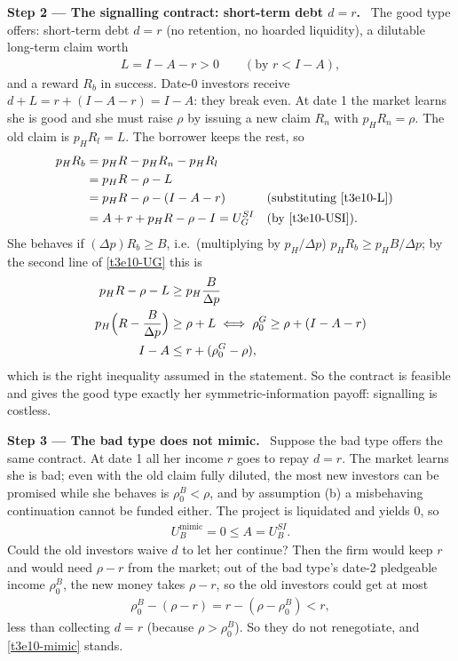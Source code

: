\documentclass[11pt,a4paper]{article}
\newcommand{\step}[2]{\par\medskip\noindent\textbf{Step #1 --- #2.}~}
\begin{document}
\step{2}{The signalling contract: short-term debt $d=r$} The good type offers: short-term debt $d=r$ (no
retention, no hoarded liquidity), a dilutable long-term claim worth
\begin{align}
  L = I-A-r > 0 \qquad (\text{by } r<I-A), \label{t3e10-L}
\end{align}
and a reward $R_b$ in success. Date-0 investors receive $d+L=r+(I-A-r)=I-A$: they break even. At date 1
the market learns she is good and she must raise $\rho$ by issuing a new claim $R_n$ with
$p_HR_n=\rho$. The old claim is $p_HR_l=L$. The borrower keeps the rest, so
\begin{align}
  p_HR_b &= p_HR-p_HR_n-p_HR_l \nonumber\\
         &= p_HR-\rho-L \nonumber\\
         &= p_HR-\rho-(I-A-r) && \text{(substituting \eqref{t3e10-L})} \nonumber\\
         &= A+r+p_HR-\rho-I = U_G^{SI} && \text{(by \eqref{t3e10-USI})}. \label{t3e10-UG}
\end{align}
She behaves if $(\Delta p)R_b\ge B$, i.e.\ (multiplying by $p_H/\Delta p$) $p_HR_b\ge p_HB/\Delta p$; by the second line of
\eqref{t3e10-UG} this is
\begin{align}
  p_HR-\rho-L &\ge p_H\frac{B}{\Delta p} \nonumber\\
  p_H\Bigl(R-\frac{B}{\Delta p}\Bigr) &\ge \rho+L \iff \rho_0^G\ge\rho+(I-A-r) \nonumber\\
  I-A &\le r+(\rho_0^G-\rho), \label{t3e10-ic}
\end{align}
which is the right inequality assumed in the statement. So the contract is feasible and gives the good
type exactly her symmetric-information payoff: signalling is costless.

\step{3}{The bad type does not mimic} Suppose the bad type offers the same contract. At date 1 all her
income $r$ goes to repay $d=r$. The market learns she is bad; even with the old claim fully diluted, the
most new investors can be promised while she behaves is $\rho_0^B<\rho$, and by assumption (b) a misbehaving
continuation cannot be funded either. The project is liquidated and yields $0$, so
\begin{align}
  U_B^{\text{mimic}} = 0 \le A = U_B^{SI}. \label{t3e10-mimic}
\end{align}
Could the old investors waive $d$ to let her continue? Then the firm would keep $r$ and would need
$\rho-r$ from the market; out of the bad type's date-2 pledgeable income $\rho_0^B$, the new money takes $\rho-r$, so the old investors could get at most
\begin{align}
  \rho_0^B-(\rho-r)=r-(\rho-\rho_0^B)<r, \nonumber
\end{align}
less than collecting $d=r$ (because $\rho>\rho_0^B$). So they do not renegotiate, and \eqref{t3e10-mimic} stands.
\end{document}
